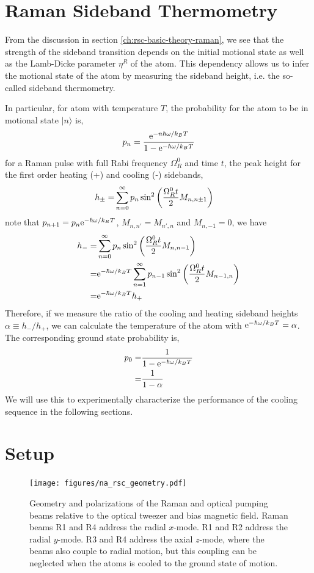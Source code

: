 \section{Raman Sideband Thermometry}

From the discussion in section \ref{ch:rsc-basic-theory-raman},
we see that the strength of the sideband transition depends on the initial motional state
as well as the Lamb-Dicke parameter $\eta^R$ of the atom.
This dependency allows us to infer the motional state of the atom
by measuring the sideband height, i.e. the so-called sideband thermometry.

In particular, for atom with temperature $T$,
the probability for the atom to be in motional state $|n\rangle$ is,
\[ p_n=\frac{\mathrm{e}^{-n\hbar\omega/k_BT}}{1-\mathrm{e}^{-\hbar\omega/k_BT}} \]
for a Raman pulse with full Rabi frequency $\Omega_R^0$ and time $t$,
the peak height for the first order heating (+) and cooling (-) sidebands,
\begin{align*}
  h_\pm=&\sum_{n=0}^\infty p_n\sin^2{\left({\frac{\Omega_R^0t}{2}M_{n,n\pm1}}\right)}
\end{align*}
note that $p_{n+1}=p_n\mathrm{e}^{-\hbar\omega/k_BT}$, $M_{n,n'}=M_{n',n}$ and $M_{n,-1}=0$, we have
\begin{align*}
  h_-=&\sum_{n=0}^\infty p_n\sin^2{\left({\frac{\Omega_R^0t}{2}M_{n,n-1}}\right)}\\
  =&\mathrm{e}^{-\hbar\omega/k_BT}\sum_{n=1}^\infty p_{n-1}\sin^2{\left({\frac{\Omega_R^0t}{2}M_{n-1,n}}\right)}\\
  =&\mathrm{e}^{-\hbar\omega/k_BT}h_+
\end{align*}
Therefore, if we measure the ratio of the cooling and heating sideband heights
$\alpha\equiv h_-/h_+$, we can calculate the temperature of the atom with
$\mathrm{e}^{-\hbar\omega/k_BT}=\alpha$.
The corresponding ground state probability is,
\begin{align*}
  p_0=&\frac{1}{1-\mathrm{e}^{-\hbar\omega/k_BT}}\\
  =&\frac{1}{1-\alpha}
\end{align*}
We will use this to experimentally characterize the performance of the cooling sequence
in the following sections.

\section{Setup}

\begin{figure}
  \centering
  \texttt{[image: figures/na\_rsc\_geometry.pdf]}
  \caption[Beams and field geometry for Sodium Raman sideband cooling]{
    Geometry and polarizations of the Raman and optical pumping beams relative to the
    optical tweezer and bias magnetic field.
    Raman beams R1 and R4 address the radial $x$-mode.
    R1 and R2 address the radial $y$-mode.
    R3 and R4 address the axial $z$-mode, where the beams also couple to radial motion,
    but this coupling can be neglected when the atoms is cooled to the ground state of motion.
    \label{fig:na-rsc-geometry}}
\end{figure}

